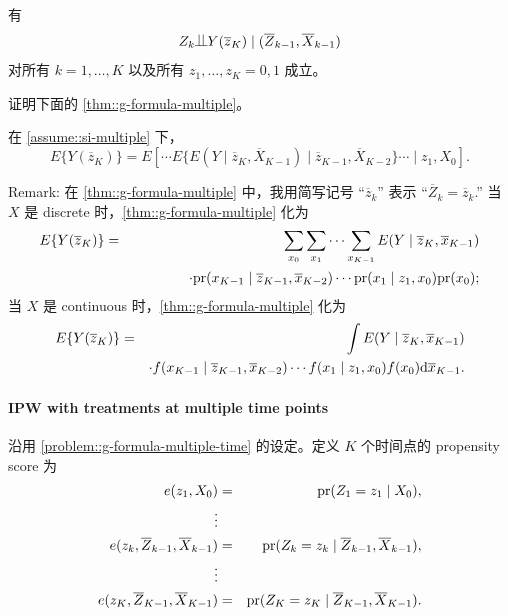 \begin{assumption}
\label{assume::si-multiple}
有
$$
Z_k \ind Y(\overline{z}_K) \mid (\overline{Z}_{k-1}, \overline{X}_{k-1})
$$
对所有 $k=1,\ldots, K$ 以及所有 $z_1,\ldots, z_K = 0,1$ 成立。
\end{assumption}


证明下面的 \cref{thm::g-formula-multiple}。


\begin{theorem}
\label{thm::g-formula-multiple}
在 \cref{assume::si-multiple} 下，
$$
E\{ Y(\overline{z}_K)  \} = E\left[ \cdots    
E\{   E(Y\mid \overline{z}_K, \overline{X}_{K-1}) \mid \overline{z}_{K-1}, \overline{X}_{K-2} \}
\cdots \mid z_1,  X_0 \right] .
$$
\end{theorem}


Remark:
在 \cref{thm::g-formula-multiple} 中，我用简写记号 ``$\overline{z}_k$'' 表示 ``$\overline{Z}_k = \overline{z}_k $.'' 
当 $X$ 是 discrete 时，\cref{thm::g-formula-multiple} 化为
\begin{eqnarray*}
 E\{ Y(\overline{z}_K)  \}  
&=& 
\sum_{x_0} \sum_{x_1} \cdots   \sum_{x_{K-1}} 
 E(Y\mid \overline{z}_K, \overline{x}_{K-1})   \\
 && 
\qquad \qquad \cdot  \textup{pr}(x_{K-1}\mid \overline{z}_{K-1}, \overline{x}_{K-2}) 
 \cdots
 \textup{pr}(x_1\mid z_{1}, x_0)
 \textup{pr}(x_0) ; 
\end{eqnarray*} 
当 $X$ 是 continuous 时，\cref{thm::g-formula-multiple} 化为
\begin{eqnarray*}
  E\{ Y(\overline{z}_K)  \}  
&=& 
\int 
 E(Y\mid \overline{z}_K, \overline{x}_{K-1})   \\
 && \cdot 
 f(x_{K-1}\mid \overline{z}_{K-1}, \overline{x}_{K-2}) 
 \cdots
 f(x_1\mid z_{1}, x_0)
 f(x_0)
 \textnormal{d} \overline{x}_{K-1}   . 
\end{eqnarray*} 





 
 \paragraph{IPW with treatments at multiple time points}\label{problem::ipw-multiple-time}

沿用 \cref{problem::g-formula-multiple-time} 的设定。定义 $K$ 个时间点的 propensity score 为
\begin{eqnarray*}
e(z_1, X_0) &=& \textup{pr}(Z_1 = z_1\mid X_0) ,\\
\vdots \\
e(z_k, \overline{Z}_{k-1},  \overline{X}_{k-1}) &=&  \textup{pr}(Z_k = z_k \mid \overline{Z}_{k-1},  \overline{X}_{k-1}) ,\\
\vdots \\
e(z_K, \overline{Z}_{K-1},  \overline{X}_{K-1}) &=&  \textup{pr}(Z_K = z_K \mid \overline{Z}_{K-1},  \overline{X}_{K-1}) .
\end{eqnarray*}


